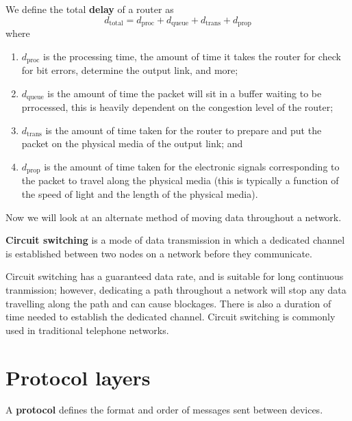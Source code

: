 \begin{definition}[Delay]
    We define the total \textbf{delay} of a router as \[ d_\text{total} = d_\text{proc} + d_\text{queue} + d_\text{trans} + d_\text{prop} \] where
    \begin{enumerate}
        \item $d_\text{proc}$ is the processing time, the amount of time it takes the router for check for bit errors, determine the output link, and more;
        \item $d_\text{queue}$ is the amount of time the packet will sit in a buffer waiting to be prrocessed, this is heavily dependent on the congestion level of the router; 
        \item $d_\text{trans}$ is the amount of time taken for the router to prepare and put the packet on the physical media of the output link; and
        \item $d_\text{prop}$ is the amount of time taken for the electronic signals corresponding to the packet to travel along the physical media (this is typically a function of the speed of light and the length of the physical media).
    \end{enumerate}
\end{definition}

Now we will look at an alternate method of moving data throughout a network.

\begin{definition}
    \textbf{Circuit switching} is a mode of data transmission in which a dedicated channel is established between two nodes on a network before they communicate. 
\end{definition}

Circuit switching has a guaranteed data rate, and is suitable for long continuous tranmission; however, dedicating a path throughout a network will stop any data travelling along the path and can cause blockages. There is also a duration of time needed to establish the dedicated channel. Circuit switching is commonly used in traditional telephone networks. 

\section{Protocol layers}
\begin{definition}[Protocol]
    A \textbf{protocol} defines the format and order of messages sent between devices. 
\end{definition}

